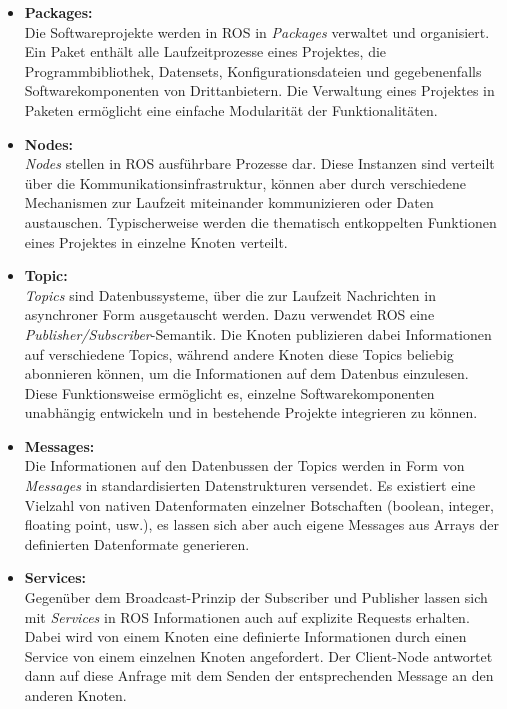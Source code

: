 \documentclass[a4paper,11pt]{scrartcl}
\begin{document}
\begin{itemize}
	\item \textbf{Packages:}\\ Die Softwareprojekte werden in ROS in \emph{Packages} verwaltet und organisiert. Ein Paket enthält alle Laufzeitprozesse eines Projektes, die Programmbibliothek, Datensets, Konfigurationsdateien und gegebenenfalls Softwarekomponenten von Drittanbietern. Die Verwaltung eines Projektes in Paketen ermöglicht eine einfache Modularität der Funktionalitäten. \\
	\item \textbf{Nodes:}\\ \emph{Nodes} stellen in ROS ausführbare Prozesse dar. Diese Instanzen sind verteilt über die Kommunikationsinfrastruktur, können aber durch verschiedene Mechanismen zur Laufzeit miteinander kommunizieren oder Daten austauschen. Typischerweise werden die thematisch entkoppelten Funktionen eines Projektes in einzelne Knoten verteilt.
	\\
	\item \textbf{Topic:}\\ \emph{Topics} sind Datenbussysteme, über die zur Laufzeit Nachrichten in asynchroner Form ausgetauscht werden. Dazu verwendet ROS eine \emph{Publisher/Subscriber}-Semantik. Die Knoten publizieren dabei Informationen auf verschiedene Topics, während andere Knoten diese Topics beliebig abonnieren können, um die Informationen auf dem Datenbus einzulesen. Diese Funktionsweise ermöglicht es, einzelne Softwarekomponenten unabhängig entwickeln und in bestehende Projekte integrieren zu können. 
	\\
	\item \textbf{Messages:}\\ Die Informationen auf den Datenbussen der Topics werden in Form von \emph{Messages} in standardisierten Datenstrukturen versendet. Es existiert eine Vielzahl von nativen Datenformaten einzelner Botschaften (boolean, integer, floating point, usw.), es lassen sich aber auch eigene Messages aus Arrays der definierten Datenformate generieren.
	\\
	\item \textbf{Services:}\\ Gegenüber dem Broadcast-Prinzip der Subscriber und Publisher lassen sich mit \emph{Services} in ROS Informationen auch auf explizite Requests erhalten. Dabei wird von einem Knoten eine definierte Informationen durch einen Service von einem einzelnen Knoten angefordert. Der Client-Node antwortet dann auf diese Anfrage mit dem Senden der entsprechenden Message an den anderen Knoten.
\end{itemize}
\end{document}
